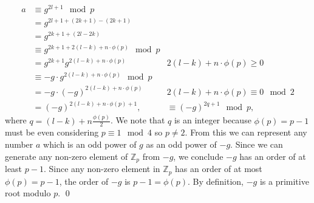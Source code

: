 \documentclass[12 pt]{amsart}
\begin{document}
  \begin{align*}
    a &\equiv  g^{2l + 1} \mod p \\
      &=  g^{2l + 1 + (2k + 1) - (2k + 1)} \\
      &=  g^{2k + 1 + (2l - 2k)} \\
      &\equiv  g^{2k + 1 + 2(l - k) + n \cdot \phi(p)} \mod p \\
      &=  g^{2k + 1} g^{2(l - k) + n \cdot \phi(p)}  & 2(l-k) + n \cdot \phi(p) \geq 0 \\
      &\equiv  -g \cdot g^{2(l - k) + n \cdot \phi(p)}  \mod p \\
      &=  -g \cdot (-g)^{2(l - k) + n \cdot \phi(p)}  & 2(l-k) + n \cdot \phi(p) \equiv 0 \mod 2 \\
      &=  (-g)^{2(l - k) + n \cdot \phi(p) + 1}, 
      &\equiv  (-g)^{2q + 1} \mod p, 
  \end{align*}
  where $q = (l - k) + n \frac{\phi(p)}{2}$. 
  We note that $q$ is an integer because $\phi(p) = p-1$ must be even considering
  $p \equiv 1 \mod 4$ so $p \neq 2$.
  From this 
  we can represent any number $a$ which is an odd power of 
  $g$ as an odd power of $-g$. 
  Since we can generate any non-zero element of $\mathbb{Z}_p$ from 
  $-g$, we conclude $-g$ has an order of at least $p-1$. 
  Since any non-zero element in $\mathbb{Z}_p$ has an order of at most
  $\phi(p) = p-1$, the order of $-g$ is $p-1 = \phi(p)$.
  By definition, $-g$ is a primitive root modulo $p$.
  \qed
  
 
  
\vfill
\newpage
\end{document}
